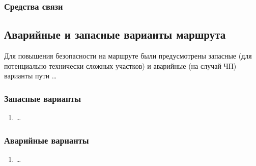 		\subsubsection{Средства связи}
			

	\subsection{Аварийные и запасные варианты маршрута}
		Для повышения безопасности на маршруте были предусмотрены запасные (для потенциально технически сложных участков) и 
		аварийные (на случай ЧП) варианты пути \dots

		\subsubsection{Запасные варианты}
			\begin{enumerate}
				\item \dots
			\end{enumerate}


		\subsubsection{Аварийные варианты}
			\begin{enumerate}
				\item \dots
			\end{enumerate}
